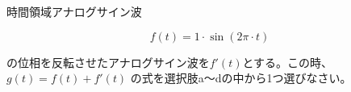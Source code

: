 時間領域アナログサイン波

\[
f(t) = 1 \cdot \sin( 2\pi \cdot t )
\]

\bigskip
\noindent  の位相を反転させたアナログサイン波を$f'(t)$とする。この時、$g(t) = f(t)+f'(t)$ の式を選択肢a〜dの中から1つ選びなさい。

